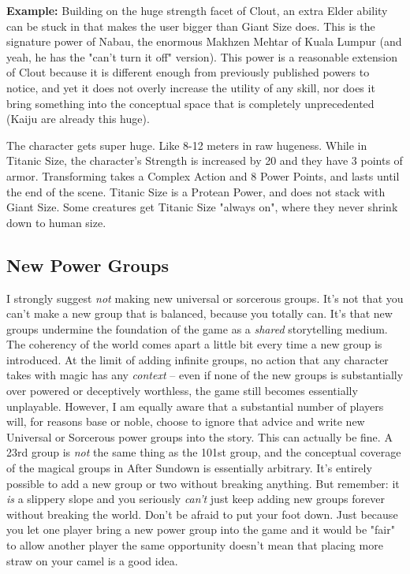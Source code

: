 \textbf{Example:} Building on the huge strength facet of Clout, an extra Elder ability can be stuck in that makes the user bigger than Giant Size does. This is the signature power of Nabau, the enormous Makhzen Mehtar of Kuala Lumpur (and yeah, he has the "can't turn it off" version). This power is a reasonable extension of Clout because it is different enough from previously published powers to notice, and yet it does not overly increase the utility of any skill, nor does it bring something into the conceptual space that is completely unprecedented (Kaiju are already this huge).

 The character gets super huge. Like 8-12 meters in raw hugeness. While in Titanic Size, the character's Strength is increased by 20 and they have 3 points of armor. Transforming takes a Complex Action and 8 Power Points, and lasts until the end of the scene. Titanic Size is a Protean Power, and does not stack with Giant Size. Some creatures get Titanic Size "always on", where they never shrink down to human size.

\subsection{New Power Groups}

I strongly suggest \textit{not} making new universal or sorcerous groups. It's not that you can't make a new group that is balanced, because you totally can. It's that new groups undermine the foundation of the game as a \textit{shared} storytelling medium. The coherency of the world comes apart a little bit every time a new group is introduced. At the limit of adding infinite groups, no action that any character takes with magic has any \textit{context} -- even if none of the new groups is substantially over powered or deceptively worthless, the game still becomes essentially unplayable. However, I am equally aware that a substantial number of players will, for reasons base or noble, choose to ignore that advice and write new Universal or Sorcerous power groups into the story. This can actually be fine. A 23rd group is \textit{not} the same thing as the 101st group, and the conceptual coverage of the magical groups in After Sundown is essentially arbitrary. It's entirely possible to add a new group or two without breaking anything. But remember: it \textit{is} a slippery slope and you seriously \textit{can't} just keep adding new groups forever without breaking the world. Don't be afraid to put your foot down. Just because you let one player bring a new power group into the game and it would be "fair" to allow another player the same opportunity doesn't mean that placing more straw on your camel is a good idea.

